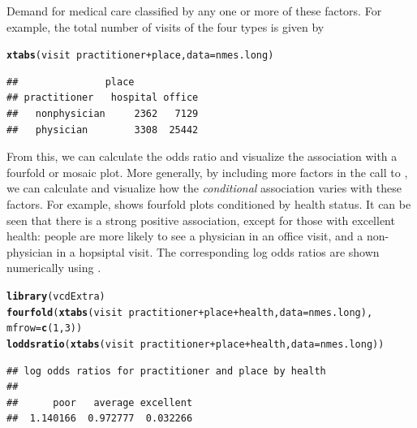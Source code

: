 \documentclass[11pt]{book}\usepackage[]{graphicx}\usepackage[]{color}
\makeatletter
\newcommand{\hlnum}[1]{\textcolor[rgb]{0.686,0.059,0.569}{#1}}%
\newcommand{\hlopt}[1]{\textcolor[rgb]{0,0,0}{#1}}%
\newcommand{\hlstd}[1]{\textcolor[rgb]{0.345,0.345,0.345}{#1}}%
\newcommand{\hlkwc}[1]{\textcolor[rgb]{0.333,0.667,0.333}{#1}}%
\newcommand{\hlkwd}[1]{\textcolor[rgb]{0.737,0.353,0.396}{\textbf{#1}}}%
\newenvironment{kframe}{%
 \def\at@end@of@kframe{}%
 \ifinner\ifhmode%
  \def\at@end@of@kframe{\end{minipage}}%
  \begin{minipage}{\columnwidth}%
 \fi\fi%
 \def\FrameCommand##1{\hskip\@totalleftmargin \hskip-\fboxsep
 \colorbox{shadecolor}{##1}\hskip-\fboxsep
     \hskip-\linewidth \hskip-\@totalleftmargin \hskip\columnwidth}%
 \MakeFramed {\advance\hsize-\width
   \@totalleftmargin\z@ \linewidth\hsize
   \@setminipage}}%
 {\par\unskip\endMakeFramed%
 \at@end@of@kframe}
\newenvironment{knitrout}{}{} %
\renewenvironment{knitrout}{\small\renewcommand{\baselinestretch}{.85}}{} %
\makeatother
\begin{document}
\begin{Example}[nmes4]{Demand for medical care}
classified by any one or more of these factors.  For example, the total number of visits of the four
types is given by
\begin{knitrout}
\color{fgcolor}\begin{kframe}
\begin{alltt}
\hlkwd{xtabs}\hlstd{(visit} \hlopt{~} \hlstd{practitioner} \hlopt{+} \hlstd{place,} \hlkwc{data}\hlstd{=nmes.long)}
\end{alltt}
\begin{verbatim}
##               place
## practitioner   hospital office
##   nonphysician     2362   7129
##   physician        3308  25442
\end{verbatim}
\end{kframe}
\end{knitrout}
From this, we can calculate the odds ratio and visualize the association with a fourfold or
mosaic plot. More generally, by including more factors in the call to , we can
calculate and visualize how the \emph{conditional} association varies with these factors.
For example,  shows fourfold plots conditioned by health status.
It can be seen that there is a strong positive association, except for those with
excellent health: people are more likely to see a physician in an office visit, and a
non-physician in a hopsiptal visit. The corresponding log odds ratios are shown numerically
using .

\begin{knitrout}
\color{fgcolor}\begin{kframe}
\begin{alltt}
\hlkwd{library}\hlstd{(vcdExtra)}
\hlkwd{fourfold}\hlstd{(}\hlkwd{xtabs}\hlstd{(visit} \hlopt{~} \hlstd{practitioner} \hlopt{+} \hlstd{place} \hlopt{+} \hlstd{health,} \hlkwc{data}\hlstd{=nmes.long),}
         \hlkwc{mfrow}\hlstd{=}\hlkwd{c}\hlstd{(}\hlnum{1}\hlstd{,}\hlnum{3}\hlstd{))}
\hlkwd{loddsratio}\hlstd{(}\hlkwd{xtabs}\hlstd{(visit} \hlopt{~} \hlstd{practitioner} \hlopt{+} \hlstd{place} \hlopt{+} \hlstd{health,} \hlkwc{data}\hlstd{=nmes.long))}
\end{alltt}
\begin{verbatim}
## log odds ratios for practitioner and place by health 
## 
##      poor   average excellent 
##  1.140166  0.972777  0.032266
\end{verbatim}
\end{kframe}\begin{figure}[!htbp]



\end{figure}
\end{knitrout}
\end{Example}
\end{document}
